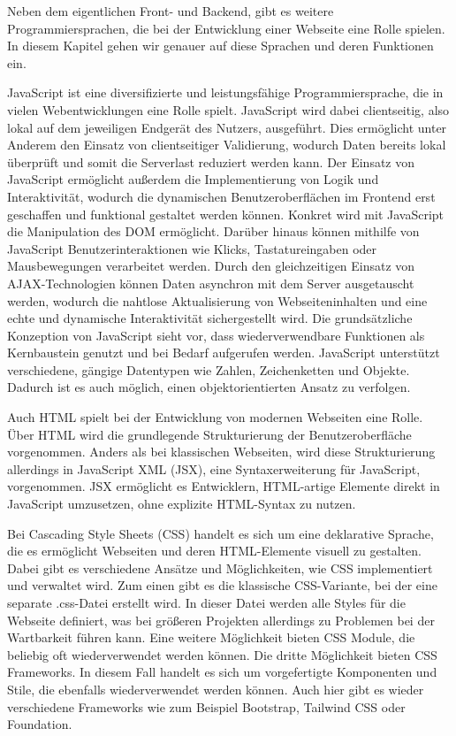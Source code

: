 Neben dem eigentlichen Front- und Backend, gibt es weitere Programmiersprachen, die bei der Entwicklung einer Webseite eine Rolle spielen. In diesem Kapitel gehen wir genauer auf diese Sprachen und deren Funktionen ein.

JavaScript ist eine diversifizierte und leistungsfähige Programmiersprache, die in vielen Webentwicklungen eine Rolle spielt. JavaScript wird dabei clientseitig, also lokal auf dem jeweiligen Endgerät des Nutzers, ausgeführt. Dies ermöglicht unter Anderem den Einsatz von clientseitiger Validierung, wodurch Daten bereits lokal überprüft und somit die Serverlast reduziert werden kann.
Der Einsatz von JavaScript ermöglicht außerdem die Implementierung von Logik und Interaktivität, wodurch die dynamischen Benutzeroberflächen im Frontend erst geschaffen und funktional gestaltet werden können. Konkret wird mit JavaScript die Manipulation des DOM ermöglicht.
Darüber hinaus können mithilfe von JavaScript Benutzerinteraktionen wie Klicks, Tastatureingaben oder Mausbewegungen verarbeitet werden. Durch den gleichzeitigen Einsatz von AJAX-Technologien können Daten asynchron mit dem Server ausgetauscht werden, wodurch die nahtlose Aktualisierung von Webseiteninhalten  und eine echte und dynamische Interaktivität sichergestellt wird.
Die grundsätzliche Konzeption von JavaScript sieht vor, dass wiederverwendbare Funktionen als Kernbaustein genutzt und bei Bedarf aufgerufen werden. JavaScript unterstützt verschiedene, gängige Datentypen wie Zahlen, Zeichenketten und Objekte. Dadurch ist es auch möglich, einen objektorientierten Ansatz zu verfolgen.

Auch HTML spielt bei der Entwicklung von modernen Webseiten eine Rolle. Über HTML wird die grundlegende Strukturierung der Benutzeroberfläche vorgenommen.
Anders als bei klassischen Webseiten, wird diese Strukturierung allerdings in JavaScript XML (JSX), eine Syntaxerweiterung für JavaScript, vorgenommen.
JSX ermöglicht es Entwicklern, HTML-artige Elemente direkt in JavaScript umzusetzen, ohne explizite HTML-Syntax zu nutzen.

Bei Cascading Style Sheets (CSS) handelt es sich um eine deklarative Sprache, die es ermöglicht Webseiten und deren HTML-Elemente visuell zu gestalten. Dabei gibt es verschiedene Ansätze und Möglichkeiten, wie CSS implementiert und verwaltet wird.
Zum einen gibt es die klassische CSS-Variante, bei der eine separate .css-Datei erstellt wird. In dieser Datei werden alle Styles für die Webseite definiert, was bei größeren Projekten allerdings zu Problemen bei der Wartbarkeit führen kann.
Eine weitere Möglichkeit bieten CSS Module, die beliebig oft wiederverwendet werden können.
Die dritte Möglichkeit bieten CSS Frameworks. In diesem Fall handelt es sich um vorgefertigte Komponenten und Stile, die ebenfalls wiederverwendet werden können. Auch hier gibt es wieder verschiedene Frameworks wie zum Beispiel Bootstrap, Tailwind CSS oder Foundation.